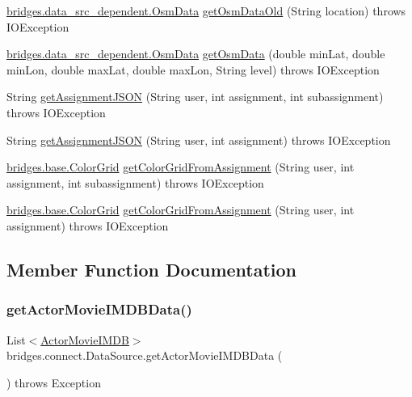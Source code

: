 \begin{DoxyCompactItemize}
\item 
\hyperlink{classbridges_1_1data__src__dependent_1_1_osm_data}{bridges.\+data\+\_\+src\+\_\+dependent.\+Osm\+Data} \hyperlink{classbridges_1_1connect_1_1_data_source_aceb702861d8db5e5540f4d459153b0a8}{get\+Osm\+Data\+Old} (String location)  throws I\+O\+Exception 
\item 
\hyperlink{classbridges_1_1data__src__dependent_1_1_osm_data}{bridges.\+data\+\_\+src\+\_\+dependent.\+Osm\+Data} \hyperlink{classbridges_1_1connect_1_1_data_source_af68a95ea0608f5bcf0be9e336f748d76}{get\+Osm\+Data} (double min\+Lat, double min\+Lon, double max\+Lat, double max\+Lon, String level)  throws I\+O\+Exception 
\item 
String \hyperlink{classbridges_1_1connect_1_1_data_source_af2f6cd7172acb64b2ba49f134b5391f8}{get\+Assignment\+J\+S\+ON} (String user, int assignment, int subassignment)  throws I\+O\+Exception 
\item 
String \hyperlink{classbridges_1_1connect_1_1_data_source_af55c85da71b588f64ff4b46dbacab7f4}{get\+Assignment\+J\+S\+ON} (String user, int assignment)  throws I\+O\+Exception 
\item 
\hyperlink{classbridges_1_1base_1_1_color_grid}{bridges.\+base.\+Color\+Grid} \hyperlink{classbridges_1_1connect_1_1_data_source_a9556950d89b39ce61bead0879d1e2192}{get\+Color\+Grid\+From\+Assignment} (String user, int assignment, int subassignment)  throws I\+O\+Exception 
\item 
\hyperlink{classbridges_1_1base_1_1_color_grid}{bridges.\+base.\+Color\+Grid} \hyperlink{classbridges_1_1connect_1_1_data_source_ab715453b17503c73075f653326c09f44}{get\+Color\+Grid\+From\+Assignment} (String user, int assignment)  throws I\+O\+Exception 
\end{DoxyCompactItemize}


\subsection{Member Function Documentation}
\mbox{\label{classbridges_1_1connect_1_1_data_source_aaaef8df40e95d5370a7f172c301d2d9f}} 
\subsubsection{\texorpdfstring{get\+Actor\+Movie\+I\+M\+D\+B\+Data()}{getActorMovieIMDBData()}\hspace{0.1cm}{\footnotesize\ttfamily [1/2]}}
{\footnotesize\ttfamily List$<$\hyperlink{classbridges_1_1data__src__dependent_1_1_actor_movie_i_m_d_b}{Actor\+Movie\+I\+M\+DB}$>$ bridges.\+connect.\+Data\+Source.\+get\+Actor\+Movie\+I\+M\+D\+B\+Data (\begin{DoxyParamCaption}{ }\end{DoxyParamCaption}) throws Exception}

